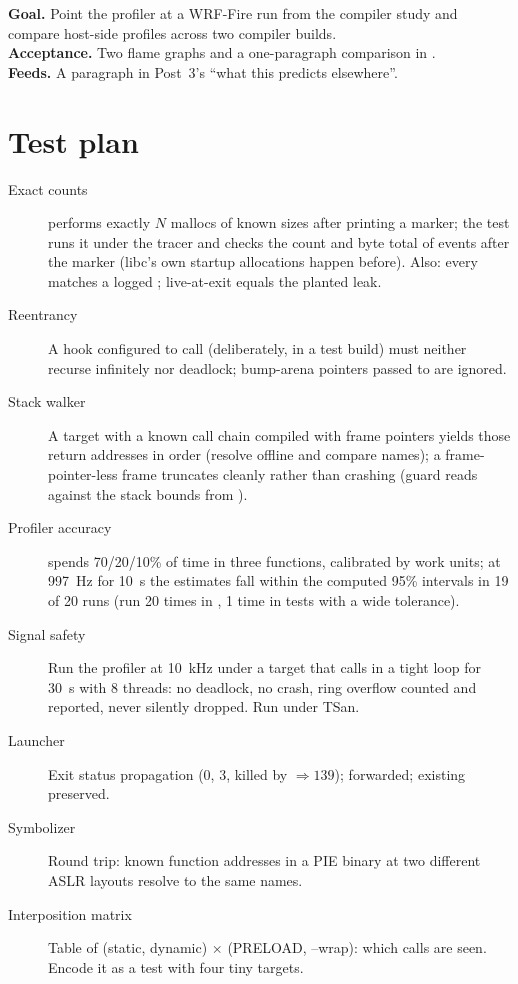 \textbf{Goal.} Point the profiler at a WRF-Fire run from the compiler study and compare host-side profiles across two compiler builds.\\
\textbf{Acceptance.} Two flame graphs and a one-paragraph comparison in .\\
\textbf{Feeds.} A paragraph in Post~3's ``what this predicts elsewhere''.

\section{Test plan}

\begin{description}
  \item[Exact counts]  performs exactly $N$ mallocs of known sizes after printing a marker; the test runs it under the tracer and checks the count and byte total of events after the marker (libc's own startup allocations happen before). Also: every  matches a logged ; live-at-exit equals the planted leak.
  \item[Reentrancy] A hook configured to call  (deliberately, in a test build) must neither recurse infinitely nor deadlock; bump-arena pointers passed to  are ignored.
  \item[Stack walker] A target with a known call chain  compiled with frame pointers yields those return addresses in order (resolve offline and compare names); a frame-pointer-less frame truncates cleanly rather than crashing (guard reads against the stack bounds from ).
  \item[Profiler accuracy]  spends 70/20/10\% of time in three functions, calibrated by work units; at 997~Hz for 10~s the estimates fall within the computed 95\% intervals in 19 of 20 runs (run 20 times in , 1 time in tests with a wide tolerance).
  \item[Signal safety] Run the profiler at 10~kHz under a target that calls  in a tight loop for 30~s with 8 threads: no deadlock, no crash, ring overflow counted and reported, never silently dropped. Run under TSan.
  \item[Launcher] Exit status propagation (0, 3, killed by  $\Rightarrow 139$);  forwarded; existing  preserved.
  \item[Symbolizer] Round trip: known function addresses in a PIE binary at two different ASLR layouts resolve to the same names.
  \item[Interposition matrix] Table of (static, dynamic) $\times$ (PRELOAD, --wrap): which calls are seen. Encode it as a test with four tiny targets.
\end{description}


